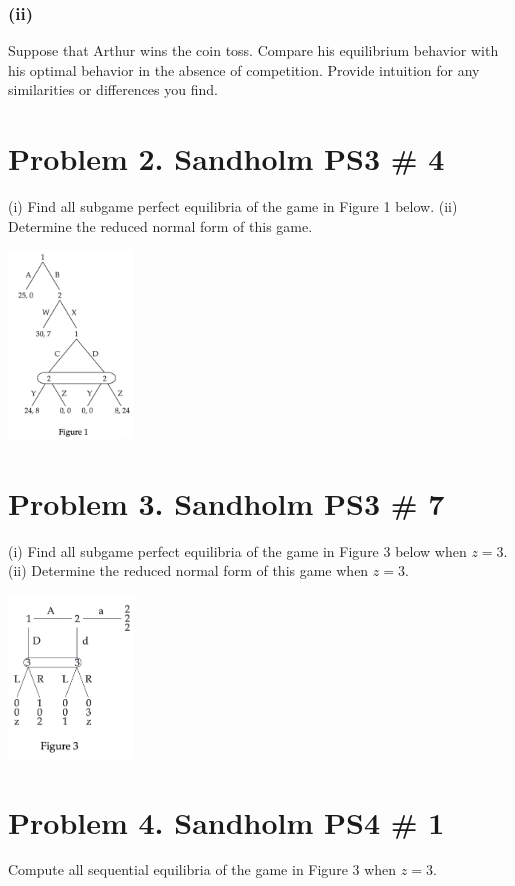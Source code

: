 \documentclass[10pt, a4paper]{article}
\begin{document}
  \subsubsection*{(ii)} 
  Suppose that Arthur wins the coin toss. Compare his equilibrium behavior with his optimal behavior in the absence of competition. Provide intuition for any similarities or differences you find.
\section*{Problem 2. Sandholm PS3 \# 4}
  (i) Find all subgame perfect equilibria of the game in Figure 1 below.
  (ii) Determine the reduced normal form of this game. 
  \begin{center}
    \includegraphics[width = 0.25\textwidth]{fig1.png}
  \end{center}
\section*{Problem 3. Sandholm PS3 \# 7}
  (i) Find all subgame perfect equilibria of the game in Figure 3 below when $z=3$.
  (ii) Determine the reduced normal form of this game when $z=3$.
  \begin{center}
    \includegraphics[width=0.25\textwidth]{fig3.png}
  \end{center}
\section*{Problem 4. Sandholm PS4 \# 1}
  Compute all sequential equilibria of the game in Figure 3 when $z=3$.
\end{document}
